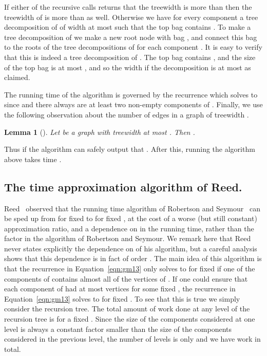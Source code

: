 \documentclass[a4paper,11pt]{article}
\newtheorem{lemma}{Lemma}[section]
\theoremstyle{definition}
\theoremstyle{remark}
\begin{document}
If either of the recursive calls returns that the treewidth is more
than  then the treewidth of  is more than  as well.
Otherwise we have for every component  a tree decomposition of
 of width at most  such that the top bag contains
.  To make a tree decomposition of  we make a
new root node with bag , and connect this bag to the roots
of the tree decompositions of  for each component
.  It is easy to verify that this is indeed a tree decomposition
of .  The top bag contains , and the size of the top bag is at
most , and so the width if the decomposition is at
most  as claimed.

The running time of the algorithm is governed by the recurrence
 which solves to  since  and there always are at least
two non-empty components of .  Finally, we use the
following observation about the number of edges in a graph of
treewidth .

\begin{lemma}[\cite{BodlaenderF05a}]
  \label{lemma:prelim:nk-edges}
  Let  be a graph with treewidth at most .  Then .
\end{lemma}


Thus if  the algorithm can safely output that .
After this, running the algorithm above takes time
.



\subsection{The  time approximation algorithm of
  Reed.}\label{sec:reedAlg}
Reed~\cite{Reed92} observed that the running time algorithm of
Robertson and Seymour~\cite{RobertsonS13} can be sped up from 
for fixed  to  for fixed , at the cost of a worse
(but still constant) approximation ratio, and a  dependence
on  in the running time, rather than the  factor in the
algorithm of Robertson and Seymour.  We remark here that
Reed~\cite{Reed92} never states explicitly the dependence on  of
his algorithm, but a careful analysis shows that this dependence is in
fact of order .  The main idea of this algorithm is that the
recurrence in Equation~\ref{eqn:gm13} only solves to  for
fixed  if one of the components of  contains almost
all of the vertices of .  If one could ensure that each component
 of  had at most  vertices for some
fixed , the recurrence in Equation~\ref{eqn:gm13} solves to
 for fixed .  To see that this is true we simply
consider the recursion tree.  The total amount of work done at any
level of the recursion tree is  for a fixed .  Since the size
of the components considered at one level is always a constant factor
smaller than the size of the components considered in the previous
level, the number of levels is only  and we have  work in total.
\end{document}
